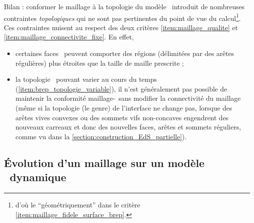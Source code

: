 Bilan : conformer le maillage à la topologie du modèle \brep\ introduit de nombreuses contraintes \textit{topologiques} qui ne sont pas pertinentes du point de vue du calcul\footnote{d'où le ``géométriquement'' dans le critère \ref{item:maillage_fidele_surface_brep}.}. 
Ces contraintes nuisent au respect des deux critères \ref{item:maillage_qualite} et \ref{item:maillage_connectivite_fixe}. 
En effet, 
\begin{itemize}
	\item certaines faces \brep\ peuvent comporter des régions (délimitées par des arêtes régulières) plus étroites que la taille de maille prescrite ;
	\item la topologie \brep\ pouvant varier au cours du temps (\cf \ref{item:brep_topologie_variable}), il n'est généralement pas possible de maintenir la conformité maillage-\brep\ sans modifier la connectivité du maillage (même si la topologie (\ie le genre) de l'interface ne change pas, \eg lorsque des arêtes vives convexes ou des sommets vifs non-concaves engendrent des nouveaux carreaux et donc des nouvelles faces, arêtes et sommets réguliers, comme vu dans la \autoref{section:construction_EdS_partielle}).
\end{itemize}



\subsection{Évolution d'un maillage sur un modèle \brep\ dynamique}
\label{section:evolution_maillage_carreau-par-carreau_sur_brep_dynamique}

